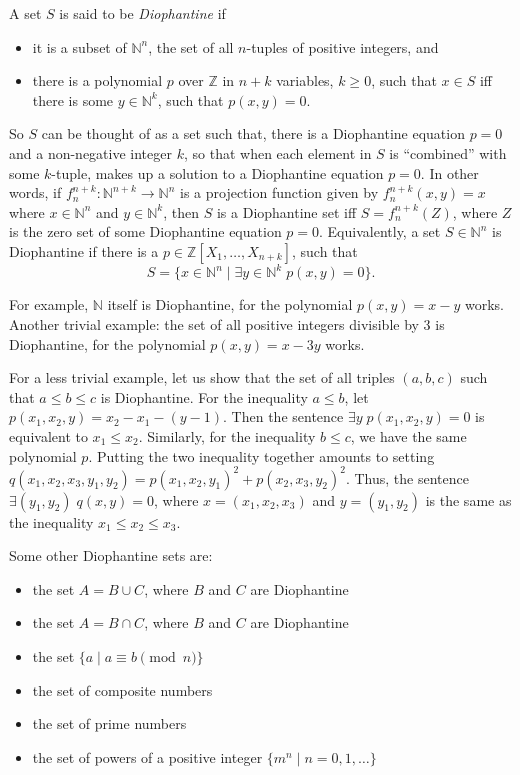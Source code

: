 \documentclass[12pt]{article}
\begin{document}

A set $S$ is said to be \emph{Diophantine} if 
\begin{itemize}
\item
it is a subset of $\mathbb{N}^n$, the set of all $n$-tuples of positive integers, and 
\item
there is a polynomial $p$ over $\mathbb{Z}$ in $n+k$ variables, $k\ge 0$, such that $x\in S$ iff there is some $y\in \mathbb{N}^k$, such that $p(x,y)=0$.
\end{itemize}

So $S$ can be thought of as a set such that, there is a Diophantine equation $p=0$ and a non-negative integer $k$, so that when each element in $S$ is ``combined'' with some $k$-tuple, makes up a solution to a Diophantine equation $p=0$.  In other words, if $f_n^{n+k}:\mathbb{N}^{n+k}\to \mathbb{N}^n$ is a projection function given by $f_n^{n+k}(x,y)=x$ where $x\in \mathbb{N}^n$ and $y\in \mathbb{N}^k$, then $S$ is a Diophantine set iff $S=f_n^{n+k}(Z)$, where $Z$ is the zero set of some Diophantine equation $p=0$.  Equivalently, a set $S\in \mathbb{N}^n$ is Diophantine if there is a $p\in \mathbb{Z}[X_1,\ldots , X_{n+k}]$, such that $$S=\lbrace x\in \mathbb{N}^n\mid \exists y\in \mathbb{N}^k \; p(x,y)=0\rbrace.$$

For example, $\mathbb{N}$ itself is Diophantine, for the polynomial $p(x,y)=x-y$ works.  Another trivial example: the set of all positive integers divisible by $3$ is Diophantine, for the polynomial $p(x,y)=x-3y$ works.  

For a less trivial example, let us show that the set of all triples $(a,b,c)$ such that $a\le b\le c$ is Diophantine.  For the inequality $a\le b$, let $p(x_1,x_2,y)= x_2-x_1-(y-1)$.  Then the sentence $\exists y \; p(x_1,x_2,y)=0$ is equivalent to $x_1\le x_2$.  Similarly, for the inequality $b\le c$, we have the same polynomial $p$.  Putting the two inequality together amounts to setting $q(x_1,x_2,x_3,y_1,y_2)=p(x_1,x_2,y_1)^2+p(x_2,x_3,y_2)^2$.  Thus, the sentence $\exists  (y_1,y_2)\; q(x,y)=0$, where $x=(x_1,x_2,x_3)$ and $y=(y_1,y_2)$ is the same as the inequality $x_1\le x_2\le x_3$.

Some other Diophantine sets are:
\begin{itemize}
\item the set $A=B\cup C$, where $B$ and $C$ are Diophantine
\item the set $A=B\cap C$, where $B$ and $C$ are Diophantine
\item the set $\lbrace a \mid a \equiv b \pmod n\rbrace$
\item the set of composite numbers
\item the set of prime numbers 
\item the set of powers of a positive integer $\lbrace m^n\mid n=0,1,\ldots \rbrace$
\end{itemize}
\end{document}
